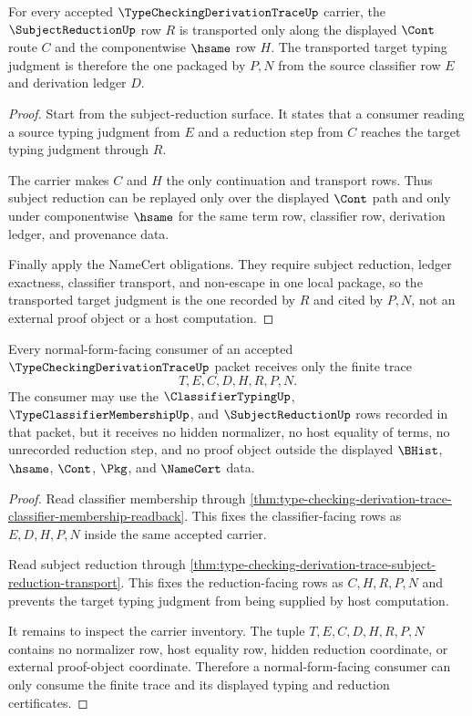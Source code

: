 \begin{theorem}
\label{thm:type-checking-derivation-trace-subject-reduction-transport}
For every accepted $\TypeCheckingDerivationTraceUp$ carrier, the $\SubjectReductionUp$ row $R$ is transported only along the displayed $\Cont$ route $C$ and the componentwise $\hsame$ row $H$. The transported target typing judgment is therefore the one packaged by $P,N$ from the source classifier row $E$ and derivation ledger $D$.
\end{theorem}
\begin{proof}
Start from the subject-reduction surface. It states that a consumer reading a source typing judgment from $E$ and a reduction step from $C$ reaches the target typing judgment through $R$.

The carrier makes $C$ and $H$ the only continuation and transport rows. Thus subject reduction can be replayed only over the displayed $\Cont$ path and only under componentwise $\hsame$ for the same term row, classifier row, derivation ledger, and provenance data.

Finally apply the NameCert obligations. They require subject reduction, ledger exactness, classifier transport, and non-escape in one local package, so the transported target judgment is the one recorded by $R$ and cited by $P,N$, not an external proof object or a host computation.
\end{proof}

\begin{theorem}
\label{thm:type-checking-derivation-trace-normal-form-consumer-boundary}
Every normal-form-facing consumer of an accepted $\TypeCheckingDerivationTraceUp$ packet receives only the finite trace
$$
T,E,C,D,H,R,P,N.
$$
The consumer may use the $\ClassifierTypingUp$, $\TypeClassifierMembershipUp$, and $\SubjectReductionUp$ rows recorded in that packet, but it receives no hidden normalizer, no host equality of terms, no unrecorded reduction step, and no proof object outside the displayed $\BHist$, $\hsame$, $\Cont$, $\Pkg$, and $\NameCert$ data.
\end{theorem}
\begin{proof}
Read classifier membership through \autoref{thm:type-checking-derivation-trace-classifier-membership-readback}. This fixes the classifier-facing rows as $E,D,H,P,N$ inside the same accepted carrier.

Read subject reduction through \autoref{thm:type-checking-derivation-trace-subject-reduction-transport}. This fixes the reduction-facing rows as $C,H,R,P,N$ and prevents the target typing judgment from being supplied by host computation.

It remains to inspect the carrier inventory. The tuple $T,E,C,D,H,R,P,N$ contains no normalizer row, host equality row, hidden reduction coordinate, or external proof-object coordinate. Therefore a normal-form-facing consumer can only consume the finite trace and its displayed typing and reduction certificates.
\end{proof}

